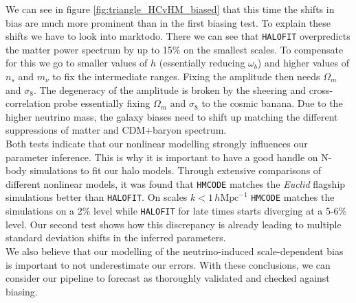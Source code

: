 \documentclass[oneside]{book}
\newcommand*{\Euclid}{\textit{Euclid}\xspace}
\newcommand*{\halofit}{\texttt{HALOFIT}\xspace}
\newcommand*{\hmcode}{\texttt{HMCODE}\xspace}
\begin{document}
We can see in figure \ref{fig:triangle_HCvHM_biased} that this time the shifts in bias are much more prominent than in the first biasing test. To explain these shifts we have to look into marktodo. There we can see that \halofit overpredicts the matter power spectrum by up to 15\% on the smallest scales. To compensate for this we go to smaller values of $h$ (essentially reducing $\omega_b$) and higher values of $n_s$ and $m_\nu$ to fix the intermediate ranges. Fixing the amplitude then needs $\Omega_m$ and $\sigma_8$. The degeneracy of the amplitude is broken by the sheering and cross-correlation probe essentially fixing $\Omega_m$ and $\sigma_8$ to the cosmic banana. Due to the higher neutrino mass, the galaxy biases need to shift up matching the different suppressions of matter and CDM+baryon spectrum.\\
Both tests indicate that our nonlinear modelling strongly influences our parameter inference. This is why it is important to have a good handle on N-body simulations to fit our halo models. Through extensive comparisons of different nonlinear models, it was found that \hmcode matches the \Euclid flagship simulations better than \halofit. On scales $k<1 \,h \mathrm{Mpc}^{-1}$ \hmcode matches the simulations on a 2\% level while \halofit for late times starts diverging at a 5-6\% level. Our second test shows how this discrepancy is already leading to multiple standard deviation shifts in the inferred parameters.\\
We also believe that our modelling of the neutrino-induced scale-dependent bias is important to not underestimate our errors. With these conclusions, we can consider our pipeline to forecast as thoroughly validated and checked against biasing. 
\end{document}
